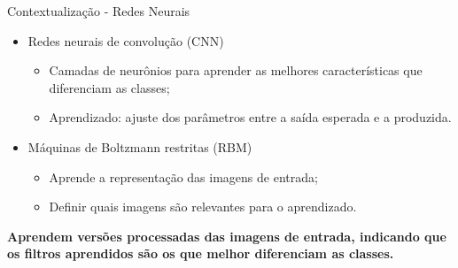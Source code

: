 \documentclass{beamer}
\begin{document}
\begin{frame}{Contextualização - Redes Neurais}
\justifying
  \begin{itemize}
    \item Redes neurais de convolução (CNN)
    \begin{itemize}
        \item Camadas de neurônios para aprender as melhores características que diferenciam as classes;
        \item Aprendizado: ajuste dos parâmetros entre a saída esperada e a produzida.
    \end{itemize}
    \item Máquinas de Boltzmann restritas (RBM)
    \begin{itemize}
        \item Aprende a representação das imagens de entrada;
        \item Definir quais imagens são relevantes para o aprendizado.
    \end{itemize}
  \end{itemize}
 \textbf{Aprendem versões processadas das imagens de entrada, indicando que os filtros aprendidos são os que melhor diferenciam as classes.}
\end{frame}
\end{document}
